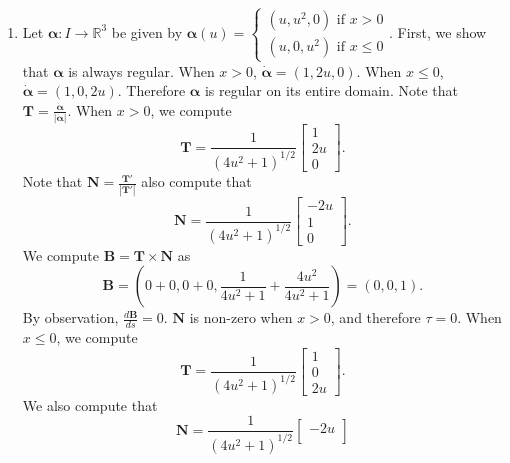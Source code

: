 \documentclass[12pt]{article}
\newcommand{\bmalpha}{\bm{\alpha}}
\newcommand{\magnitude}[1]{\left\lvert #1 \right\rvert}
\begin{document}
\begin{enumerate}[label=\Alph*., leftmargin=*]
    \item Let $\bmalpha:I\rightarrow \mathbb{R}^3$ be given by $\bmalpha(u)=\begin{cases}
        (u,u^2,0) \text{ if }x>0\\
        (u,0,u^2) \text{ if }x \leq 0
    \end{cases}.$ First, we show that $\bmalpha$ is always regular. When $x>0$, $\dot{\bmalpha}=(1,2u,0)$. When $x\leq 0$, $\dot{\bmalpha}=(1,0,2u)$. Therefore $\bmalpha$ is regular on its entire domain.
    Note that $\bm{T}=\frac{\dot{\bmalpha}}{\magnitude{\dot{\bmalpha}}}$. When $x>0$, we compute
    \begin{equation*}
        \bm{T}=\frac{1}{{(4u^2+1)}^{1/2}}\begin{bmatrix}
            1\\
            2u\\
            0
        \end{bmatrix}.
    \end{equation*}
    Note that $\bm{N}=\frac{\bm{T'}}{\magnitude{\bm{T'}}}$ also compute that\begin{equation*}
        \bm{N}=\frac{1}{{(4u^2+1)}^{1/2}}\begin{bmatrix}
            -2u\\
            1\\
            0
        \end{bmatrix}.
    \end{equation*} We compute $\bm{B}=\bm{T}\times\bm{N}$ as\begin{equation*}
        \bm{B}=(0+0,0+0, \frac{1}{4u^2+1}+\frac{4u^2}{4u^2+1})=(0,0,1).
    \end{equation*} By observation, $\frac{d\bm{B}}{ds}=0$. $\bm{N}$ is non-zero when $x>0$, and therefore $\tau = 0$.
    When $x\leq 0$, we compute\begin{equation*}
        \bm{T}=\frac{1}{{(4u^2+1)}^{1/2}}\begin{bmatrix}
            1\\
            0\\
            2u
        \end{bmatrix}.
    \end{equation*} We also compute that\begin{equation*}
        \bm{N}=\frac{1}{{(4u^2+1)}^{1/2}}\begin{bmatrix}
            -2u\\

\end{bmatrix}
\end{equation*}
\end{enumerate}
\end{document}

